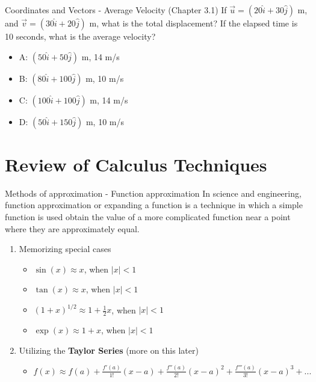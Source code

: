 \documentclass{beamer}
\begin{document}
\begin{frame}{Coordinates and Vectors - Average Velocity (Chapter 3.1)}
If $\vec{u} = (20\hat{i}+30\hat{j})$ m, and $\vec{v} = (30\hat{i}+20\hat{j})$ m, what is the total displacement?  If the elapsed time is 10 seconds, what is the average velocity? \\
\vspace{0.2cm}
\begin{itemize}
\item A: $(50\hat{i} + 50\hat{j})$ m, 14 m/s
\item B: $(80\hat{i} + 100\hat{j})$ m, 10 m/s
\item C: $(100\hat{i} + 100\hat{j})$ m, 14 m/s
\item D: $(50\hat{i} + 150\hat{j})$ m, 10 m/s
\end{itemize}
\end{frame}

\section{Review of Calculus Techniques}

\begin{frame}{Methods of approximation - Function approximation}
In science and engineering, \alert{function approximation} or \alert{expanding a function} is a technique in which a simple function is used obtain the value of a more complicated function near a point where they are approximately equal. 
\begin{enumerate}
\item Memorizing \alert{special cases}
\begin{itemize}
\item $\sin(x) \approx x$, when $|x| < 1$
\item $\tan(x) \approx x$, when $|x| < 1$
\item $(1+x)^{1/2} \approx 1+ \frac{1}{2}x$, when $|x| < 1$
\item $\exp(x) \approx 1 + x$, when $|x| < 1$
\end{itemize}
\item Utilizing the \textbf{Taylor Series} (more on this later)
\begin{itemize}
\item $f(x) \approx f(a) + \frac{f'(a)}{1!}(x-a) + \frac{f''(a)}{2!}(x-a)^2 + \frac{f'''(a)}{3!}(x-a)^3 + ...$
\end{itemize}
\end{enumerate}
\end{frame}
\end{document}
